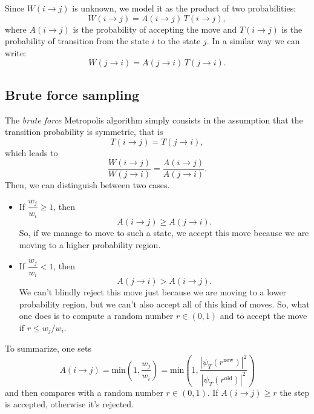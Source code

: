 Since $W(i \rightarrow j)$ is unknown, we model it as the product of two probabilities:
\begin{equation}
	W(i \rightarrow j)=A(i \rightarrow j) \, T(i \rightarrow j),
\end{equation}
where $A(i \rightarrow j)$ is the probability of accepting the move and $T(i \rightarrow j)$ is the probability of transition from the state $i$ to the state $j$. In a similar way we can write:
\begin{equation}
	W(j \rightarrow i)=A(j \rightarrow i) \, T(j \rightarrow i).
\end{equation}

\subsection{Brute force sampling}
The \emph{brute force} Metropolis algorithm simply consists in the assumption that the transition probability is symmetric, that is
\begin{equation}
	T(i \rightarrow j)= T (j \rightarrow i),
\end{equation}
which leads to
\begin{equation}
	\frac{W(i \rightarrow j )}{W(j \rightarrow i)}=\frac{A(i \rightarrow j )}{A(j \rightarrow i)}.
\end{equation}
Then, we can distinguish between two cases.
\begin{itemize}
	\item If $\dfrac{w_j}{w_i}\geq 1$, then
	\begin{equation}
		A(i \rightarrow j ) \geq A(j \rightarrow i).
	\end{equation}
	So, if we manage to move to such a state, we accept this move because we are moving to a higher probability region.
	\item If $\dfrac{w_j}{w_i} < 1$, then
	\begin{equation}
		A(j \rightarrow i ) > A(i \rightarrow j).
	\end{equation}
	We can't blindly reject this move just because we are moving to a lower probability region, but we can't also accept all of this kind of moves. So, what one does is to compute a random number $r \in (0,1)$ and to accept the move if $r \leq w_j/w_i$.
\end{itemize}
To summarize, one sets
\begin{equation}
	A(i\rightarrow j) 
	= \text{min} \left(1, \frac{w_j}{w_i} \right)
	= \text{min} \left(1, \frac{|\psi_T(r^{\text{new}})|^2}{|\psi_T(r^{\text{old}})|^2} \right)
\end{equation}
and then compares with a random number $r \in (0,1)$. If $A(i\rightarrow j) \geq r$ the step is accepted, otherwise it's rejected.

